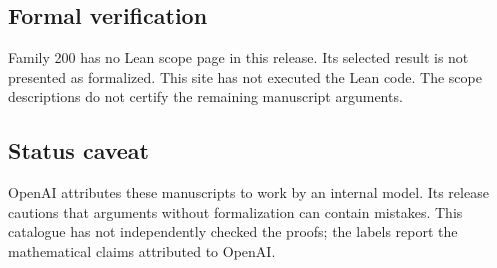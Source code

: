 \documentclass[11pt]{article}
\begin{document}
\subsection{Formal verification}
Family 200 has no Lean scope page in this release. Its selected result is not presented as formalized. This site has not executed the Lean code. The scope descriptions do not certify the remaining manuscript arguments.

\subsection{Status caveat}
OpenAI attributes these manuscripts to work by an internal model. Its release cautions that arguments without formalization can contain mistakes. This catalogue has not independently checked the proofs; the labels report the mathematical claims attributed to OpenAI.
\end{document}

